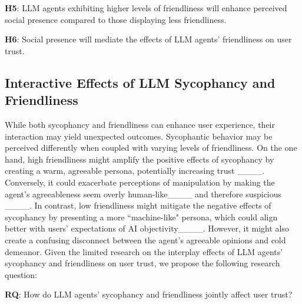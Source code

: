 

\vspace{2pt}
\textbf{H5}: LLM agents exhibiting higher levels of friendliness will enhance perceived social presence compared to those displaying less friendliness.

\vspace{2pt}
\textbf{H6}: Social presence will mediate the effects of LLM agents' friendliness on user trust. 

\subsection{Interactive Effects of LLM Sycophancy and Friendliness}
While both sycophancy and friendliness can enhance user experience, their interaction may yield unexpected outcomes. Sycophantic behavior  may be perceived differently when coupled with varying levels of friendliness. On the one hand, high friendliness might amplify the positive effects of sycophancy by creating a warm, agreeable persona, potentially increasing trust ____. Conversely, it could exacerbate perceptions of manipulation by making the agent's agreeableness seem overly human-like____ and therefore suspicious ____. In contrast, low friendliness might mitigate the negative effects of sycophancy by presenting a more ``machine-like" persona, which could align better with users' expectations of AI objectivity____. However, it might also create a confusing disconnect between the agent's agreeable opinions and cold demeanor. Given the limited research on the interplay effects of LLM agents' sycophancy and friendliness on user trust, we propose the following research question: 

\vspace{2pt}
\textbf{RQ}: How do LLM agents' sycophancy and friendliness jointly affect user trust? 
